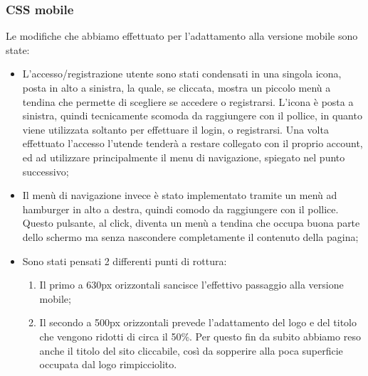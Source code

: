\subsubsection{CSS mobile}
Le modifiche che abbiamo effettuato per l’adattamento alla versione mobile sono state:
\begin{itemize}
\item L’accesso/registrazione utente sono stati condensati in una singola icona, posta in alto a sinistra, la quale, se cliccata, mostra un piccolo menù a tendina che permette di scegliere se accedere o registrarsi. L'icona è posta a sinistra, quindi tecnicamente scomoda da raggiungere con il pollice, in quanto viene utilizzata soltanto per effettuare il login, o registrarsi. Una volta effettuato l'accesso l'utende tenderà a restare collegato con il proprio account, ed ad utilizzare principalmente il menu di navigazione, spiegato nel punto successivo;
\item Il menù di navigazione invece è stato implementato tramite un menù ad hamburger in alto a destra, quindi comodo da raggiungere con il pollice. Questo pulsante, al click, diventa un menù a tendina che occupa buona parte dello schermo ma senza nascondere completamente il contenuto della pagina;
\item Sono stati pensati 2 differenti punti di rottura:
\begin{enumerate}
\item Il primo a 630px orizzontali sancisce l’effettivo passaggio alla versione mobile;
\item Il secondo a 500px orizzontali prevede l’adattamento del logo e del titolo che vengono ridotti di circa il 50\%. Per questo fin da subito abbiamo reso anche il titolo del sito cliccabile, così da sopperire alla poca superficie occupata dal logo rimpicciolito.
\end{enumerate}
\end{itemize}

